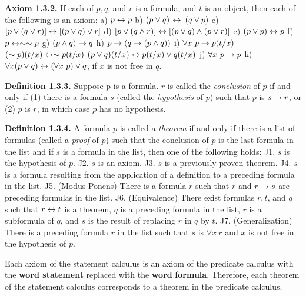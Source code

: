 \begin{large}
\textbf{Axiom 1.3.2.} If each of $p,q$, and $r$ is a formula, and $t$ is an object, then each of the following is an axiom: \nl
a) $p \leftrightarrow p$ \nl
b) $(p \lor q)$ $\leftrightarrow$ $( q \lor p)$ \nl
c) $[p\lor (q\lor r)] \leftrightarrow [(p \lor q) \lor r] $\nl
d) $[p \lor (q \wedge r)] \leftrightarrow [(p \lor q) \wedge (p \lor r)]$ \nl
e) $(p \lor p) \leftrightarrow p$ \nl
f) $p \leftrightarrow \sim \sim p$ \nl
g) $(p \wedge q) \to q$ \nl
h) $p \to (q \to (p \wedge q))$\nl
i) $\forall x~ p \to p(t/x)$ \nl
\qqu $(\sim  p) (t/x) \leftrightarrow \sim p(t/x)$ \nl
\qqu $(p \lor q) (t/x) \leftrightarrow p(t/x) \lor q(t/x)$ \nl
j) $\forall x~ p \to p$ \nl
k) $\forall x(p \lor q)\leftrightarrow (\forall x~ p) \lor q$, if $x$ is not free in $q$. \nl

\textbf{Definition 1.3.3.} Suppose p is a formula. $r$ is called the \textit{conclusion} of $p$ if and only if (1) there is a formula $s$ (called the \textit{hypothesis} of $p$) such that $p$ is $s \to r$, or (2) $p$ is $r$, in which case $p$ has no hypothesis. \nl

\textbf{Definition 1.3.4.} A formula $p$ is called a \textit{theorem} if and only if there is a list of formulas (called a \textit{proof} of $p$) such that the conclusion of $p$ is the last formula in the list and if $s$ is a formula in the list, then one of the following holds: \nl
J1. $s$ is the hypothesis of $p$. \nl
J2. $s$ is an axiom. \nl
J3. $s$ is a previously proven theorem. \nl
J4. $s$ is a formula resulting from the application of a definition to a preceding formula in the list. \nl
J5. (Modus Ponens) There is a formula $r$ such that $r$ and $r \to s$ are pre­ceding formulas in the list. \nl
\newpage
J6. (Equivalence) There exist formulas $r, t$, and $q$ such that $r \leftrightarrow t$ is a
theorem, $q$ is a preceding formula in the list, $r$ is a subformula of $q$,
and $s$ is the result of replacing $r$ in $q$ by $t$.\nl
J7. (Generalization) There is a preceding formula $r$ in the list such that $s$ is $\forall x~ r$ and $x$ is not free in the hypothesis of $p$. \nl

\qqu Each axiom of the statement calculus is an axiom of the predicate calculus with the \textbf{word statement} replaced with the \textbf{word} \textbf{formula}. Therefore, each theorem of the statement calculus corresponds to a theorem in the predicate calculus. \nl


\end{large}

